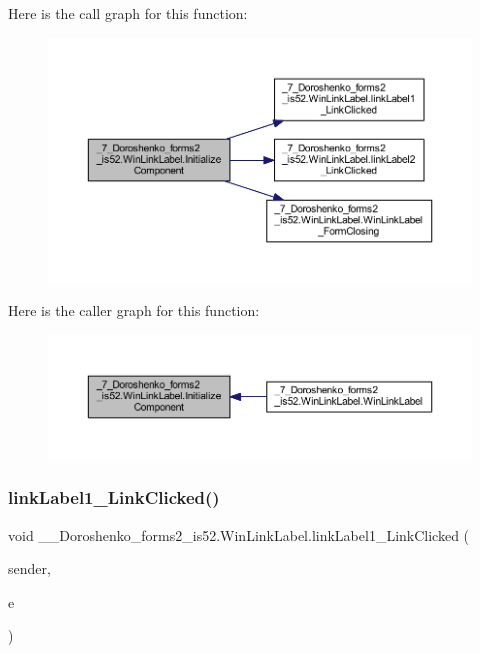 Here is the call graph for this function\+:
\nopagebreak
\begin{figure}[H]
\begin{center}
\leavevmode
\includegraphics[width=350pt]{class__7___doroshenko__forms2__is52_1_1_win_link_label_a7a9e712d1d3faa8d7ae3f7072d526379_cgraph}
\end{center}
\end{figure}
Here is the caller graph for this function\+:
\nopagebreak
\begin{figure}[H]
\begin{center}
\leavevmode
\includegraphics[width=350pt]{class__7___doroshenko__forms2__is52_1_1_win_link_label_a7a9e712d1d3faa8d7ae3f7072d526379_icgraph}
\end{center}
\end{figure}
\hypertarget{class__7___doroshenko__forms2__is52_1_1_win_link_label_a91ad99163450a8eaf8eadb364697099a}{}\label{class__7___doroshenko__forms2__is52_1_1_win_link_label_a91ad99163450a8eaf8eadb364697099a} 
\subsubsection{\texorpdfstring{link\+Label1\+\_\+\+Link\+Clicked()}{linkLabel1\_LinkClicked()}}
{\footnotesize\ttfamily void \+\_\+\_\+\+Doroshenko\+\_\+forms2\+\_\+is52.\+Win\+Link\+Label.\+link\+Label1\+\_\+\+Link\+Clicked (\begin{DoxyParamCaption}\item[{object}]{sender,  }\item[{Link\+Label\+Link\+Clicked\+Event\+Args}]{e }\end{DoxyParamCaption})\hspace{0.3cm}{\ttfamily [private]}}

